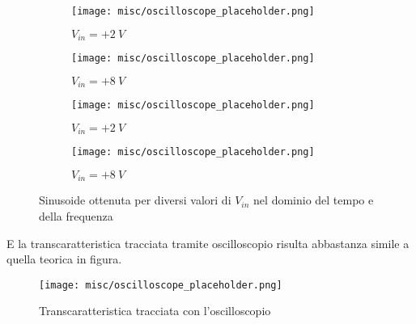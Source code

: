 \begin{figure}[H]
    \centering

    \begin{subfigure}{.5\textwidth}
        \centering
        \texttt{[image: misc/oscilloscope\_placeholder.png]}
        \caption{$V_{in}=+2\ V$}
        \label{acq_sine_2V}
    \end{subfigure}%
    \begin{subfigure}{.5\textwidth}
        \centering
        \texttt{[image: misc/oscilloscope\_placeholder.png]}
        \caption{$V_{in}=+8\ V$}
        \label{acq_sine_8V}
    \end{subfigure}
    \begin{subfigure}{.5\textwidth}
        \centering
        \texttt{[image: misc/oscilloscope\_placeholder.png]}
        \caption{$V_{in}=+2\ V$}
        \label{acq_fourier_2V}
    \end{subfigure}%
    \begin{subfigure}{.5\textwidth}
        \centering
        \texttt{[image: misc/oscilloscope\_placeholder.png]}
        \caption{$V_{in}=+8\ V$}
        \label{acq_fourier_8V}
    \end{subfigure}

    \caption{Sinusoide ottenuta per diversi valori di $V_{in}$ nel dominio del tempo e
        della frequenza}
    \label{acq_sine}
\end{figure}


E la transcaratteristica tracciata tramite oscilloscopio risulta abbastanza simile a quella
teorica in figura.

\begin{figure}[H]
    \centering
    \texttt{[image: misc/oscilloscope\_placeholder.png]}
    \caption{Transcaratteristica tracciata con l'oscilloscopio}
    \label{acq_sine_oscilloscope}
\end{figure}

